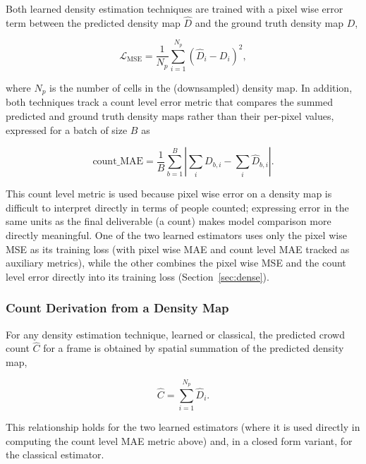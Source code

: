 Both learned density estimation techniques are trained with a pixel wise error term between the predicted density map $\hat D$ and the ground truth density map $D$,

\begin{equation}
	\mathcal{L}_{\text{MSE}} = \frac{1}{N_p}\sum_{i=1}^{N_p}\left(\hat D_i - D_i\right)^2,
\end{equation}

where $N_p$ is the number of cells in the (downsampled) density map. In addition, both techniques track a count level error metric that compares the summed predicted and ground truth density maps rather than their per-pixel values, expressed for a batch of size $B$ as

\begin{equation}
	\text{count\_MAE} = \frac{1}{B}\sum_{b=1}^{B}\left|\sum_{i} D_{b,i} - \sum_{i} \hat D_{b,i}\right|.
\end{equation}

This count level metric is used because pixel wise error on a density map is difficult to interpret directly in terms of people counted; expressing error in the same units as the final deliverable (a count) makes model comparison more directly meaningful. One of the two learned estimators uses only the pixel wise MSE as its training loss (with pixel wise MAE and count level MAE tracked as auxiliary metrics), while the other combines the pixel wise MSE and the count level error directly into its training loss (Section~\ref{sec:dense}).

\subsubsection{Count Derivation from a Density Map}

For any density estimation technique, learned or classical, the predicted crowd count $\hat C$ for a frame is obtained by spatial summation of the predicted density map,

\begin{equation}
	\hat C = \sum_{i=1}^{N_p} \hat D_i .
	\label{eq:density-sum}
\end{equation}

This relationship holds for the two learned estimators (where it is used directly in computing the count level MAE metric above) and, in a closed form variant, for the classical estimator.